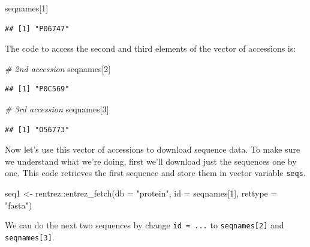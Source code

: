 \documentclass[
]{book}
\newenvironment{Shaded}{\begin{snugshade}}{\end{snugshade}}
\newcommand{\AttributeTok}[1]{\textcolor[rgb]{0.77,0.63,0.00}{#1}}
\newcommand{\CommentTok}[1]{\textcolor[rgb]{0.56,0.35,0.01}{\textit{#1}}}
\newcommand{\DecValTok}[1]{\textcolor[rgb]{0.00,0.00,0.81}{#1}}
\newcommand{\FunctionTok}[1]{\textcolor[rgb]{0.00,0.00,0.00}{#1}}
\newcommand{\NormalTok}[1]{#1}
\newcommand{\OtherTok}[1]{\textcolor[rgb]{0.56,0.35,0.01}{#1}}
\newcommand{\SpecialCharTok}[1]{\textcolor[rgb]{0.00,0.00,0.00}{#1}}
\newcommand{\StringTok}[1]{\textcolor[rgb]{0.31,0.60,0.02}{#1}}
\begin{document}
\begin{Shaded}
\begin{Highlighting}[]
\NormalTok{seqnames[}\DecValTok{1}\NormalTok{]}
\end{Highlighting}
\end{Shaded}

\begin{verbatim}
## [1] "P06747"
\end{verbatim}

The code to access the second and third elements of the vector of accessions is:

\begin{Shaded}
\begin{Highlighting}[]
\CommentTok{\# 2nd accession}
\NormalTok{seqnames[}\DecValTok{2}\NormalTok{]}
\end{Highlighting}
\end{Shaded}

\begin{verbatim}
## [1] "P0C569"
\end{verbatim}

\begin{Shaded}
\begin{Highlighting}[]
\CommentTok{\# 3rd accession}
\NormalTok{seqnames[}\DecValTok{3}\NormalTok{]}
\end{Highlighting}
\end{Shaded}

\begin{verbatim}
## [1] "O56773"
\end{verbatim}

Now let's use this vector of accessions to download sequence data. To make sure we understand what we're doing, first we'll download just the sequences one by one. This code retrieves the first sequence and store them in vector variable \texttt{seqs}.

\begin{Shaded}
\begin{Highlighting}[]
\NormalTok{seq1 }\OtherTok{\textless{}{-}}\NormalTok{ rentrez}\SpecialCharTok{::}\FunctionTok{entrez\_fetch}\NormalTok{(}\AttributeTok{db =} \StringTok{"protein"}\NormalTok{, }
                          \AttributeTok{id =}\NormalTok{ seqnames[}\DecValTok{1}\NormalTok{], }
                          \AttributeTok{rettype =} \StringTok{"fasta"}\NormalTok{)      }
\end{Highlighting}
\end{Shaded}

We can do the next two sequences by change \texttt{id\ =\ ...} to \texttt{seqnames{[}2{]}} and \texttt{seqnames{[}3{]}}.
\end{document}
